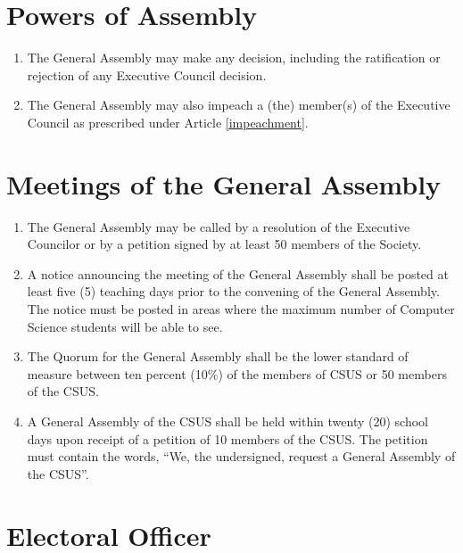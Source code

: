 \section{Powers of Assembly}\label{powers-of-assembly}

\begin{enumerate}
\def\labelenumi{\arabic{enumi}.}
\item
  The General Assembly may make any decision, including the ratification
  or rejection of any Executive Council decision.
\item
  The General Assembly may also impeach a (the) member(s) of the
  Executive Council as prescribed under Article \ref{impeachment}.
\end{enumerate}

\section{Meetings of the General
Assembly}\label{meetings-of-the-general-assembly}

\begin{enumerate}
\def\labelenumi{\arabic{enumi}.}
\item
  The General Assembly may be called by a resolution of the Executive
  Councilor or by a petition signed by at least 50
  members of the Society.
\item
  A notice announcing the meeting of the General Assembly shall be
  posted at least five (5) teaching days prior to the convening of the
  General Assembly. The notice must be posted in areas where the maximum
  number of Computer Science students will be able to see.
\item
  The Quorum for the General Assembly shall be the lower standard of measure between ten percent (10\%) of the members of CSUS or 50 members of the CSUS.
\item
  A General Assembly of the CSUS shall be held within twenty (20) school
  days upon receipt of a petition of 10 members of the CSUS. The
  petition must contain the words, ``We, the undersigned, request a
  General Assembly of the CSUS''.
\end{enumerate}

\section{Electoral Officer}\label{electoral-officer}

